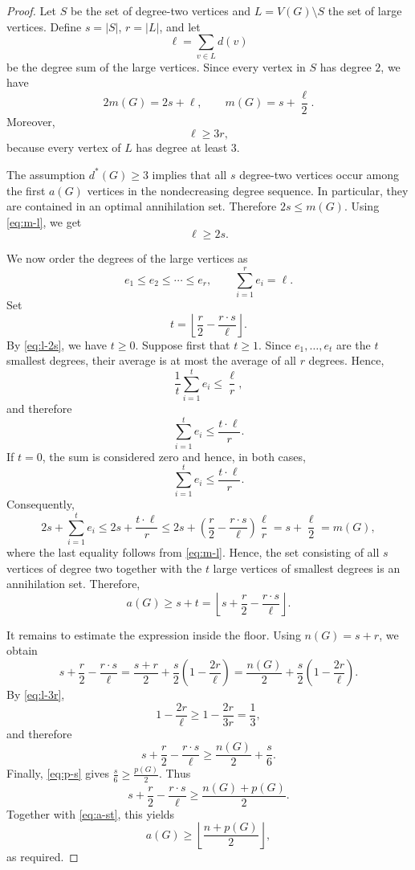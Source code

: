 \documentclass[10pt,a4paper]{amsart}
\begin{document}
\begin{proof}
Let $S$ be the set of degree-two vertices and $L=V(G)\setminus S$ the set of large vertices. Define $s=|S|$, $r=|L|$, and let
$$\ell=\sum_{v\in L}d(v)$$
be the degree sum of the large vertices. Since every vertex in $S$ has degree $2$, we have
\begin{equation}\label{eq:m-l}
2m(G)=2s+\ell, \qquad m(G)=s+\frac{\ell}{2}.
\end{equation}
Moreover,
\begin{equation}\label{eq:l-3r}
 \ell\ge3r,
\end{equation}
because every vertex of $L$ has degree at least $3$.

The assumption $d^*(G)\ge 3$ implies that all $s$ degree-two vertices occur among the first $a(G)$ vertices in the nondecreasing degree sequence. In particular, they are contained in an optimal annihilation set. Therefore $2s\le m(G)$. Using \eqref{eq:m-l}, we get
\begin{equation}\label{eq:l-2s}
\ell \ge 2s.
\end{equation}

We now order the degrees of the large vertices as
$$e_1\le e_2\le\cdots\le e_r, \qquad \sum_{i=1}^{r}e_i=\ell.$$
Set
$$t=\left\lfloor \frac{r}{2}-\frac{r\cdot s}{\ell}\right\rfloor.$$
By \eqref{eq:l-2s}, we have $t\ge 0$. Suppose first that $t\ge 1$. Since $e_1,\ldots,e_t$ are the $t$ smallest degrees, their average is at most the average of all $r$ degrees. Hence,
$$\frac{1}{t}\sum_{i=1}^{t}e_i\le\frac{\ell}{r},$$
and therefore
$$\sum_{i=1}^{t}e_i\le\frac{t\cdot\ell}{r}.$$
If $t=0$, the sum is considered zero and hence, in both cases,
$$\sum_{i=1}^{t}e_i\le\frac{t\cdot\ell}{r}.$$
Consequently,
$$2s+\sum_{i=1}^{t}e_i \le 2s+\frac{t \cdot \ell}{r} \le 2s+\left(\frac{r}{2}-\frac{r \cdot s}{\ell}\right)\frac{\ell}{r}=s+\frac{\ell}{2}=m(G),$$
where the last equality follows from \eqref{eq:m-l}. Hence, the set consisting of all $s$ vertices of degree two together with the $t$ large vertices of smallest degrees is an annihilation set. Therefore,
\begin{equation}\label{eq:a-st}
a(G)\ge s+t =\left\lfloor s+\frac r2-\frac{r \cdot s}{\ell}\right\rfloor.
\end{equation}

It remains to estimate the expression inside the floor. Using $n(G)=s+r$, we obtain
$$s+\frac r2-\frac{r \cdot s}{\ell}=\frac{s+r}{2}+\frac{s}{2}\left(1-\frac{2r}{\ell}\right)=\frac{n(G)}{2}+\frac{s}{2}\left(1-\frac{2r}{\ell}\right).$$
By \eqref{eq:l-3r},
$$1-\frac{2r}{\ell}\ge 1-\frac{2r}{3r}=\frac{1}{3},$$
and therefore
$$s+\frac r2-\frac{r \cdot s}{\ell}\ge \frac {n(G)}{2}+\frac{s}{6}.$$
Finally, \eqref{eq:p-s} gives $\frac{s}{6}\ge \frac{p(G)}{2}$. Thus
$$s+\frac{r}{2}-\frac{r \cdot s}{\ell} \ge \frac{n(G)+p(G)}{2}.$$
Together with \eqref{eq:a-st}, this yields
$$a(G)\ge\left\lfloor\frac{n+p(G)}2\right\rfloor,$$
as required.
\end{proof}
\end{document}
